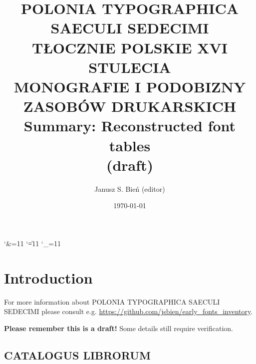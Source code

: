 \documentclass[12pt]{article}
\newcommand{\J}[1]{{\Junicode #1}}
\begin{document}


\title{POLONIA TYPOGRAPHICA
  SAECULI SEDECIMI\\
  { TŁOCZNIE POLSKIE XVI STULECIA\\ MONOGRAFIE I PODOBIZNY
    ZASOBÓW DRUKARSKICH}\\Summary: Reconstructed font tables\\
  (draft)}

\author{Janusz S. Bień (editor)}

\date{\today}

\maketitle

\catcode`\&=11
\catcode`\|=11
\catcode`\_=11

\def\apostrof{`}



\def\Hb#1{{\fontspec{Junicode}#1}}

\newcommand{\alfa}{\textit{alfa} (\J{α})}
\renewcommand{\beta}{\textit{beta} (\J{β})}
\renewcommand{\delta}{\textit{delta} (\J{δ})}
\renewcommand{\epsilon}{\textit{epsilon} (\J{ε})}
\renewcommand{\eta}{\textit{eta} (\J{η})}
\renewcommand{\theta}{\textit{theta} (\J{θ})}
\renewcommand{\gamma}{\textit{gamma} (\J{γ})}
\renewcommand{\chi}{\textit{chi} (\J{χ})}
\renewcommand{\kappa}{\textit{kappa} (\J{κ})}
\renewcommand{\iota}{\textit{iota} (\J{ι})}
\renewcommand{\lambda}{\textit{lambda} (\J{λ})}


\section{Introduction}
\label{sec:introduction}

For more information about \textsc{POLONIA TYPOGRAPHICA SAECULI
  SEDECIMI} please consult
e.g. \url{https://github.com/jsbien/early_fonts_inventory}.

\bigskip

\bigskip \textbf{Please remember this is a draft!} Some details still
require verification.

\subsection{CATALOGUS LIBRORUM}
\label{sec:catalogus-librorum}
\end{document}

